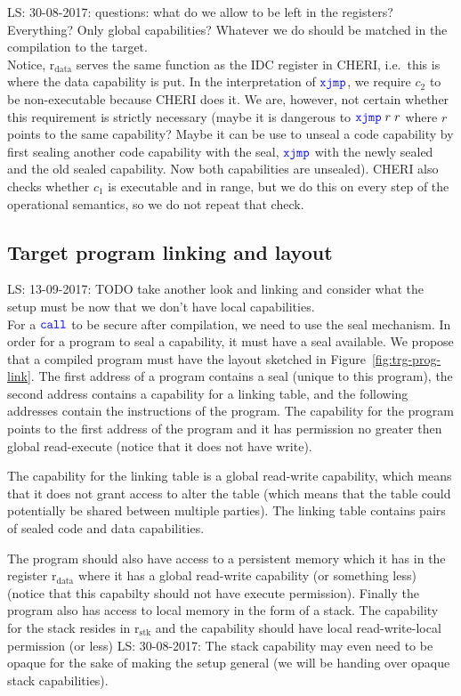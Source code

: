 \documentclass[a4paper]{article}
\newcommand\lau[1]{{\color{purple} \sf \footnotesize {LS: #1}}\\}
\newcommand{\sourcecolor}{\color{blue}}
\newcommand{\src}[1]{{\sourcecolor #1}}
\newcommand{\zinstr}[1]{\texttt{#1}}
\newcommand{\twoinstr}[3]{
  \ifthenelse{\equal{#2#3}{}}
  {\zinstr{#1}}
  {\zinstr{#1} \; #2 \; #3}
}
\newcommand{\scall}[2]{\twoinstr{\src{call}}{#1}{#2}}
\newcommand{\sxjmp}[2]{\twoinstr{\src{xjmp}}{#1}{#2}}
\newcommand{\rstk}{\mathrm{r}_\mathrm{stk}}
\newcommand{\rdata}{\mathrm{r}_\mathrm{data}}
\begin{document}
\lau{30-08-2017: questions: what do we allow to be left in the registers? Everything? Only global capabilities? Whatever we do should be matched in the compilation to the target.}

Notice, $\rdata$ serves the same function as the IDC register in CHERI, i.e.\ this is where the data capability is put. In the interpretation of $\sxjmp{}{}$, we require $c_2$ to be non-executable because CHERI does it. We are, however, not certain whether this requirement is strictly necessary (maybe it is dangerous to $\sxjmp{r}{r}$ where $r$ points to the same capability? Maybe it can be use to unseal a code capability by first sealing another code capability with the seal, $\sxjmp{}{}$ with the newly sealed and the old sealed capability. Now both capabilities are unsealed). CHERI also checks whether $c_1$ is executable and in range, but we do this on every step of the operational semantics, so we do not repeat that check.



\subsection{Target program linking and layout}
\lau{13-09-2017: TODO take another look and linking and consider what the setup must be now that we don't have local capabilities.}
For a $\scall{}{}$ to be secure after compilation, we need to use the seal mechanism. In order for a program to seal a capability, it must have a seal available. We propose that a compiled program must have the layout sketched in Figure~\ref{fig:trg-prog-link}. The first address of a program contains a seal (unique to this program), the second address contains a capability for a linking table, and the following addresses contain the instructions of the program. The capability for the program points to the first address of the program and it has permission no greater then global read-execute (notice that it does not have write).

The capability for the linking table is a global read-write capability, which means that it does not grant access to alter the table (which means that the table could potentially be shared between multiple parties). The linking table contains pairs of sealed code and data capabilities.

The program should also have access to a persistent memory which it has in the register $\rdata$ where it has a global read-write capability (or something less) (notice that this capabilty should not have execute permission). Finally the program also has access to local memory in the form of a stack. The capability for the stack resides in $\rstk$ and the capability should have local read-write-local permission (or less)
\lau{30-08-2017: The stack capability may even need to be opaque for the sake of making the setup general (we will be handing over opaque stack capabilities).}
\end{document}
